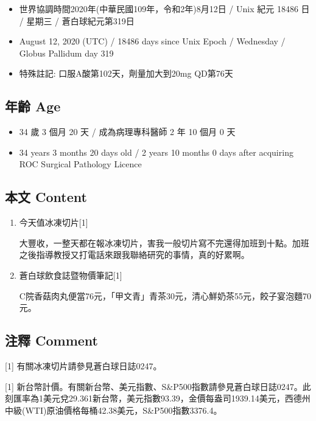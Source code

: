 \documentclass[a5paper, 11pt
]{book}
\providecommand{\tightlist}{%
  \setlength{\itemsep}{0pt}\setlength{\parskip}{0pt}}
\begin{document}
\begin{itemize}
\tightlist
\item
  世界協調時間2020年(中華民國109年，令和2年)8月12日 / Unix 紀元 18486 日
  / 星期三 / 蒼白球紀元第319日
\item
  August 12, 2020 (UTC) / 18486 days since Unix Epoch / Wednesday /
  Globus Pallidum day 319
\item
  特殊註記: 口服A酸第102天，劑量加大到20mg QD第76天
\end{itemize}

\hypertarget{ux5e74ux9f61-age-72}{%
\subsection{年齡 Age}\label{ux5e74ux9f61-age-72}}

\begin{itemize}
\tightlist
\item
  34 歲 3 個月 20 天 / 成為病理專科醫師 2 年 10 個月 0 天
\item
  34 years 3 months 20 days old / 2 years 10 months 0 days after
  acquiring ROC Surgical Pathology Licence
\end{itemize}

\hypertarget{ux672cux6587-content-72}{%
\subsection{本文 Content}\label{ux672cux6587-content-72}}

\begin{enumerate}
\def\labelenumi{\arabic{enumi}.}
\item
  今天值冰凍切片{[}1{]}

  大豐收，一整天都在報冰凍切片，害我一般切片寫不完還得加班到十點。加班之後指導教授又打電話來跟我聯絡研究的事情，真的好累啊。
\item
  蒼白球飲食誌暨物價筆記{[}1{]}

  C院香菇肉丸便當76元，「甲文青」青茶30元，清心鮮奶茶55元，餃子宴泡麵70元。
\end{enumerate}

\hypertarget{ux6ce8ux91cb-comment-72}{%
\subsection{注釋 Comment}\label{ux6ce8ux91cb-comment-72}}

{[}1{]} 有關冰凍切片請參見蒼白球日誌0247。

{[}1{]}
新台幣計價。有關新台幣、美元指數、S\&P500指數請參見蒼白球日誌0247。此刻匯率為1美元兌29.361新台幣，美元指數93.39，金價每盎司1939.14美元，西德州中級(WTI)原油價格每桶42.38美元，S\&P500指數3376.4。
\end{document}
